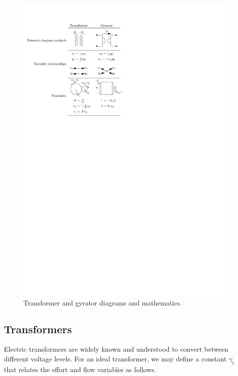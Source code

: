\documentclass[lettersize,journal]{IEEEtran}
\begin{document}
\begin{figure}[tb]
        \centering
        \includegraphics[width=\columnwidth]{wec_as_multiport_transformer_gyrator.pdf}
        \caption{Transformer and gyrator diagrams and mathematics.}
        \label{fig:wec_as_multiport_transformer_gyrator}
\end{figure}

\subsection{Transformers}\label{sec:trasnformers}
Electric transformers are widely known and understood to convert between different voltage levels.
For an ideal transformer, we may define a constant $\gamma_{t}$ that relates the effort and flow variables as follows.
\end{document}
